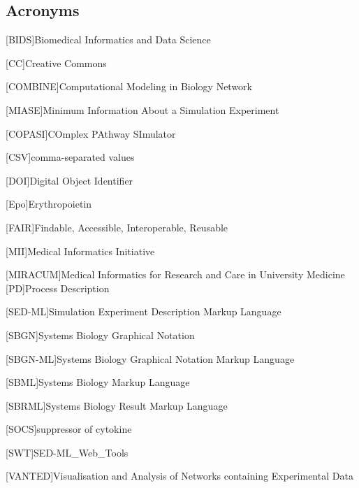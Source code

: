 \subsection*{Acronyms}
    \begin{acronym}[acrmeta]
        
        [BIDS]{Biomedical Informatics and Data Science}
       
       [CC]{Creative Commons}
       
       
        [COMBINE]{Computational Modeling in Biology Network}
        
        [MIASE]{Minimum Information About a Simulation Experiment}
        
        [COPASI]{COmplex PAthway SImulator}
        
        [CSV]{comma-separated values}
        
        [DOI]{Digital Object Identifier}
        
        [Epo]{Erythropoietin}
        
        [FAIR]{Findable, Accessible, Interoperable, Reusable}
        
        [MII]{Medical Informatics Initiative}
        
        [MIRACUM]{Medical Informatics for Research and Care in University
Medicine}
        [PD]{Process Description}
        
        [SED-ML]{Simulation Experiment Description Markup Language}
        
        [SBGN]{Systems Biology Graphical Notation}
        
        [SBGN-ML]{Systems Biology Graphical Notation Markup Language}
        
        [SBML]{Systems Biology Markup Language}
        
        [SBRML]{Systems Biology Result Markup Language}
        
        [SOCS]{suppressor of cytokine}
        
                [SWT]{SED-ML\_Web\_Tools}
        
        [VANTED]{Visualisation and Analysis of Networks containing Experimental Data}

    \end{acronym}